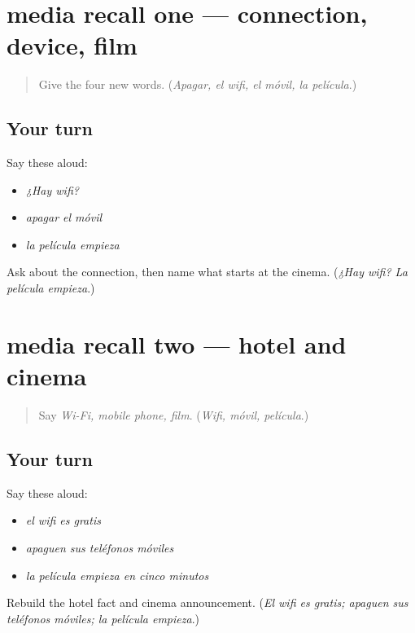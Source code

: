 \section[(review)]{media recall one — connection, device, film}

\label{lesson:ES-C404-media-recall-1}



\begin{quote}
Give the four new words. (\emph{Apagar, el wifi, el móvil, la película}.)
\end{quote}

\subsection*{Your turn}
Say these aloud:

\begin{itemize}
\raggedright
  \item \emph{¿Hay wifi?}
  \item \emph{apagar el móvil}
  \item \emph{la película empieza}
\end{itemize}

\begin{tcolorbox}[breakable,colback=teal!4,colframe=teal!35!black,title={Before you move on}]
Ask about the connection, then name what starts at the cinema. (\emph{¿Hay wifi? La película empieza}.)
\end{tcolorbox}
\section[(review)]{media recall two — hotel and cinema}

\label{lesson:ES-C404-media-recall-2}



\begin{quote}
Say \emph{Wi-Fi, mobile phone, film}. (\emph{Wifi, móvil, película}.)
\end{quote}

\subsection*{Your turn}
Say these aloud:

\begin{itemize}
\raggedright
  \item \emph{el wifi es gratis}
  \item \emph{apaguen sus teléfonos móviles}
  \item \emph{la película empieza en cinco minutos}
\end{itemize}

\begin{tcolorbox}[breakable,colback=teal!4,colframe=teal!35!black,title={Before you move on}]
Rebuild the hotel fact and cinema announcement. (\emph{El wifi es gratis; apaguen sus teléfonos móviles; la película empieza}.)
\end{tcolorbox}
